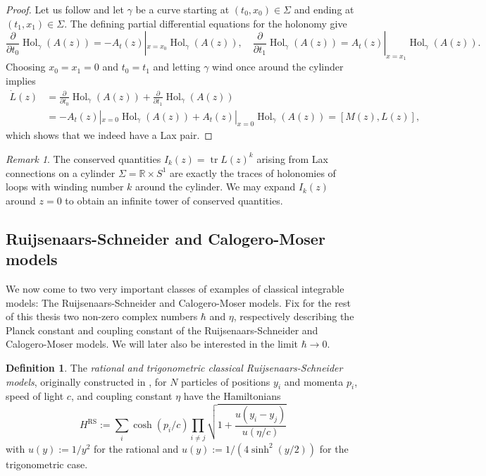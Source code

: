 \documentclass[11pt]{report}
\theoremstyle{definition}
\newtheorem{definition}[theorem]{Definition}
\theoremstyle{remark}
\newtheorem*{remark}{Remark}
\theoremstyle{remark}
\newcommand{\R}{\mathbb{R}}
\begin{document}
\begin{proof}
Let us follow \cite{notes:beisert:2014} and let $\gamma$ be a curve starting at $(t_0,x_0) \in \Sigma$ and ending at $(t_1,x_1) \in \Sigma$. The defining partial differential equations for the holonomy give
\begin{equation*}
\frac{\partial}{\partial t_0} \operatorname{Hol}_\gamma(A(z)) = -A_t(z)|_{x=x_0} \operatorname{Hol}_\gamma(A(z)), \quad \frac{\partial}{\partial t_1} \operatorname{Hol}_\gamma(A(z)) = A_t(z)|_{x=x_1} \operatorname{Hol}_\gamma(A(z)).
\end{equation*}
Choosing $x_0 = x_1 = 0$ and $t_0 = t_1$ and letting $\gamma$ wind once around the cylinder implies
\begin{align*}
\dot L(z)
&= \frac{\partial}{\partial t_0} \operatorname{Hol}_\gamma(A(z)) + \frac{\partial}{\partial t_1} \operatorname{Hol}_\gamma(A(z)) \\
&=  - A_t(z)|_{x=0} \operatorname{Hol}_\gamma(A(z)) + A_t(z)|_{x=0} \operatorname{Hol}_\gamma(A(z)) = [M(z),L(z)],
\end{align*}
which shows that we indeed have a Lax pair.
\end{proof}

\begin{remark}
The conserved quantities $I_k(z) = \operatorname{tr} L(z)^k$ arising from Lax connections on a cylinder $\Sigma = \R \times S^1$ are exactly the traces of holonomies of loops with winding number $k$ around the cylinder. We may expand $I_k(z)$ around $z=0$ to obtain an infinite tower of conserved quantities.
\end{remark}

\subsection{Ruijsenaars-Schneider and Calogero-Moser models}

We now come to two very important classes of examples of classical integrable models: The Ruijsenaars-Schneider and Calogero-Moser models. Fix for the rest of this thesis two non-zero complex numbers $\hbar$ and $\eta$, respectively describing the Planck constant and coupling constant of the Ruijsenaars-Schneider and Calogero-Moser models. We will later also be interested in the limit $\hbar \to 0$.

\begin{definition}
The \emph{rational and trigonometric classical Ruijsenaars-Schneider models}, originally constructed in \cite{article:ruijsenaars:1987}, for $N$ particles of positions $y_i$ and momenta $p_i$, speed of light $c$, and coupling constant $\eta$ have the Hamiltonians
\begin{equation}\label{equation:ratRSHamiltonian}
H^\text{RS} := \sum_i \cosh(p_i/c) \prod_{i \neq j} \sqrt{1 + \frac{u(y_i - y_j)}{u(\eta/c)}}
\end{equation}
with $u(y) := 1/y^2$ for the rational and $u(y) := 1/(4\sinh^2(y/2))$ for the trigonometric case.
\end{definition}
\end{document}
